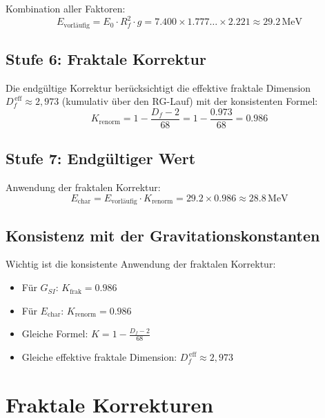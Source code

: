 	Kombination aller Faktoren:
	\begin{equation}
		E_{\text{vorläufig}} = E_0 \cdot R_f^2 \cdot g = 7.400 \times 1.777\ldots \times 2.221 \approx 29.2\,\text{MeV}
	\end{equation}
	
	\subsection{Stufe 6: Fraktale Korrektur}
	
	Die endgültige Korrektur berücksichtigt die effektive fraktale Dimension $D_f^{\,\text{eff}} \approx 2{,}973$ (kumulativ über den RG-Lauf) mit der konsistenten Formel:
	\begin{equation}
		K_{\text{renorm}} = 1 - \frac{D_f - 2}{68} = 1 - \frac{0.973}{68} = 0.986
	\end{equation}
	
	\subsection{Stufe 7: Endgültiger Wert}
	
	Anwendung der fraktalen Korrektur:
	\begin{equation}
		E_{\text{char}} = E_{\text{vorläufig}} \cdot K_{\text{renorm}} = 29.2 \times 0.986 \approx 28.8\,\text{MeV}
	\end{equation}
	
	\subsection{Konsistenz mit der Gravitationskonstanten}
	
	Wichtig ist die konsistente Anwendung der fraktalen Korrektur:
	\begin{itemize}
		\item Für $G_{SI}$: $K_{\text{frak}} = 0.986$
		\item Für $E_{\text{char}}$: $K_{\text{renorm}} = 0.986$
		\item Gleiche Formel: $K = 1 - \frac{D_f - 2}{68}$
		\item Gleiche effektive fraktale Dimension: $D_f^{\,\text{eff}} \approx 2{,}973$
	\end{itemize}
	
	\section{Fraktale Korrekturen}
	

